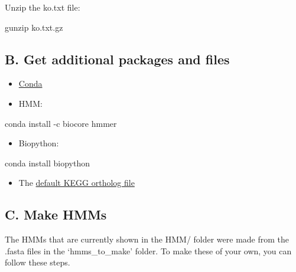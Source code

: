 \documentclass[
]{article}
\newenvironment{Shaded}{\begin{snugshade}}{\end{snugshade}}
\newcommand{\ExtensionTok}[1]{#1}
\newcommand{\FunctionTok}[1]{\textcolor[rgb]{0.00,0.00,0.00}{#1}}
\newcommand{\NormalTok}[1]{#1}
\providecommand{\tightlist}{%
  \setlength{\itemsep}{0pt}\setlength{\parskip}{0pt}}
\begin{document}
Unzip the ko.txt file:

\begin{Shaded}
\begin{Highlighting}[]
\FunctionTok{gunzip}\NormalTok{ ko.txt.gz}
\end{Highlighting}
\end{Shaded}

\hypertarget{b.-get-additional-packages-and-files}{%
\subsection{B. Get additional packages and
files}\label{b.-get-additional-packages-and-files}}

\begin{itemize}
\tightlist
\item
  \href{https://docs.conda.io/projects/conda/en/latest/commands/install.html}{Conda}
\item
  HMM:
\end{itemize}

\begin{Shaded}
\begin{Highlighting}[]
\ExtensionTok{conda}\NormalTok{ install -c biocore hmmer}
\end{Highlighting}
\end{Shaded}

\begin{itemize}
\tightlist
\item
  Biopython:
\end{itemize}

\begin{Shaded}
\begin{Highlighting}[]
\ExtensionTok{conda}\NormalTok{ install biopython}
\end{Highlighting}
\end{Shaded}

\begin{itemize}
\tightlist
\item
  The
  \href{https://github.com/picrust/picrust2/blob/master/picrust2/default_files/prokaryotic/ko.txt.gz}{default
  KEGG ortholog file}
\end{itemize}

\hypertarget{c.-make-hmms}{%
\subsection{C. Make HMMs}\label{c.-make-hmms}}

The HMMs that are currently shown in the HMM/ folder were made from the
.fasta files in the `hmms\_to\_make' folder. To make these of your own,
you can follow these steps.
\end{document}
